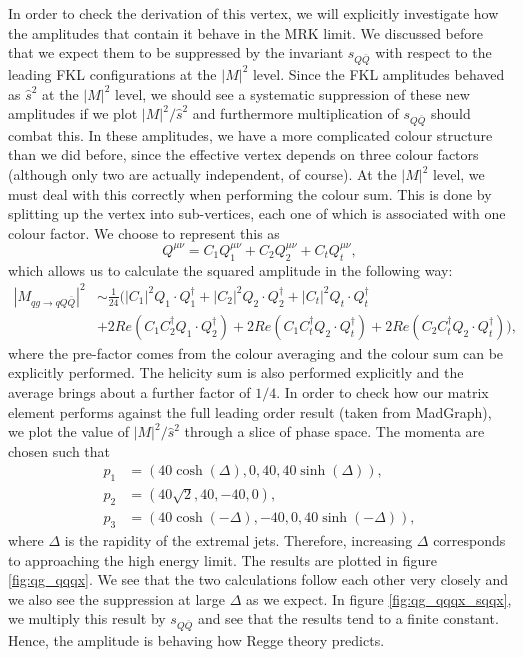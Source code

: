 In order to check the derivation of this vertex, we will explicitly investigate how the amplitudes that contain it behave in the MRK limit. We discussed before that we expect them to be suppressed by the invariant $s_{Q\bar{Q}}$ with respect to the leading FKL configurations at the $|M|^2$ level. Since the FKL amplitudes behaved as $\hat{s}^2$ at the $|M|^2$ level, we should see a systematic suppression of these new amplitudes if we plot $|M|^2/\hat{s}^2$ and furthermore multiplication of $s_{Q \bar{Q}}$ should combat this. In these amplitudes, we have a more complicated colour structure than we did before, since the effective vertex depends on three colour factors (although only two are actually independent, of course). At the $|M|^2$ level, we must deal with this correctly when performing the colour sum. This is done by splitting up the vertex into sub-vertices, each one of which is associated with one colour factor. We choose to represent this as
\begin{equation}
Q^{\mu \nu} = C_1 Q^{\mu \nu}_1 + C_2 Q^{\mu \nu}_2 + C_t Q^{\mu \nu}_t,
\end{equation}
which allows us to calculate the squared amplitude in the following way:
\begin{equation}
\begin{split}
|M_{qg \to qQ\bar{Q}}|^2 &\sim \frac{1}{24} \bigg(|C_1|^2 Q_1\cdot Q_1^\dagger + |C_2|^2 Q_2 \cdot Q_2^\dagger + |C_t|^2 Q_t \cdot Q_t^\dagger \\
&+ 2 Re(C_1 C_2^\dagger Q_1 \cdot Q_2^{\dagger}) + 2 Re(C_1 C_t^\dagger Q_2 \cdot Q_t^\dagger) + 2 Re(C_2 C_t^\dagger Q_2 \cdot Q_t^\dagger) \bigg),
\end{split}
\end{equation}
where the pre-factor comes from the colour averaging and the colour sum can be explicitly performed. The helicity sum is also performed explicitly and the average brings about a further factor of $1/4$. In order to check how our matrix element performs against the full leading order result (taken from MadGraph), we plot the value of $|M|^2/\hat{s}^2$ through a slice of phase space. The momenta are chosen such that
\begin{equation}
\begin{split}
p_1 & = (40 \cosh(\Delta), 0, 40, 40 \sinh(\Delta)), \\
p_2 & = (40 \sqrt{2}, 40 , -40, 0), \\
p_3 & = (40 \cosh(-\Delta), -40, 0, 40 \sinh(-\Delta)), 
\end{split}
\end{equation}
where $\Delta$ is the rapidity of the extremal jets. Therefore, increasing $\Delta$ corresponds to approaching the high energy limit. The results are plotted in figure \ref{fig:qg_qqqx}. We see that the two calculations follow each other very closely and we also see the suppression at large $\Delta$ as we expect. In figure \ref{fig:qg_qqqx_sqqx}, we multiply this result by $s_{Q \bar{Q}}$ and see that the results tend to a finite constant. Hence, the amplitude is behaving how Regge theory predicts.

